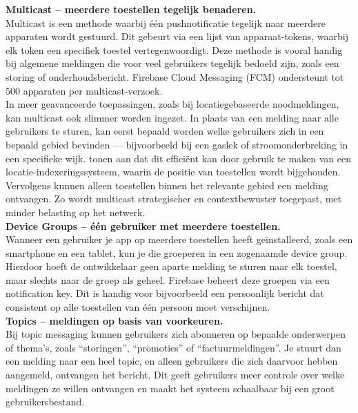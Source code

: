 \textbf{Multicast – meerdere toestellen tegelijk benaderen.}\\
Multicast is een methode waarbij één pushnotificatie tegelijk naar meerdere apparaten wordt gestuurd. Dit gebeurt via een lijst van apparaat-tokens, waarbij elk token een specifiek toestel vertegenwoordigt. Deze methode is vooral handig bij algemene meldingen die voor veel gebruikers tegelijk bedoeld zijn, zoals een storing of onderhoudsbericht. Firebase Cloud Messaging (FCM) ondersteunt tot 500 apparaten per multicast-verzoek.\\

In meer geavanceerde toepassingen, zoals bij locatiegebaseerde noodmeldingen, kan multicast ook slimmer worden ingezet. In plaats van een melding naar alle gebruikers te sturen, kan eerst bepaald worden welke gebruikers zich in een bepaald gebied bevinden — bijvoorbeeld bij een gaslek of stroomonderbreking in een specifieke wijk. \textcite{ThuThuZan2018} tonen aan dat dit efficiënt kan door gebruik te maken van een locatie-indexeringssysteem, waarin de positie van toestellen wordt bijgehouden. Vervolgens kunnen alleen toestellen binnen het relevante gebied een melding ontvangen. Zo wordt multicast strategischer en contextbewuster toegepast, met minder belasting op het netwerk.\\

\textbf{Device Groups – één gebruiker met meerdere toestellen.}\\
Wanneer een gebruiker je app op meerdere toestellen heeft geïnstalleerd, zoals een smartphone en een tablet, kun je die groeperen in een zogenaamde device group. Hierdoor hoeft de ontwikkelaar geen aparte melding te sturen naar elk toestel, maar slechts naar de groep als geheel. Firebase beheert deze groepen via een notification key. Dit is handig voor bijvoorbeeld een persoonlijk bericht dat consistent op alle toestellen van één persoon moet verschijnen.\\

\textbf{Topics – meldingen op basis van voorkeuren.}\\  
Bij topic messaging kunnen gebruikers zich abonneren op bepaalde onderwerpen of thema’s, zoals “storingen”, “promoties” of “factuurmeldingen”. Je stuurt dan een melding naar een heel topic, en alleen gebruikers die zich daarvoor hebben aangemeld, ontvangen het bericht. Dit geeft gebruikers meer controle over welke meldingen ze willen ontvangen en maakt het systeem schaalbaar bij een groot gebruikersbestand.\\

